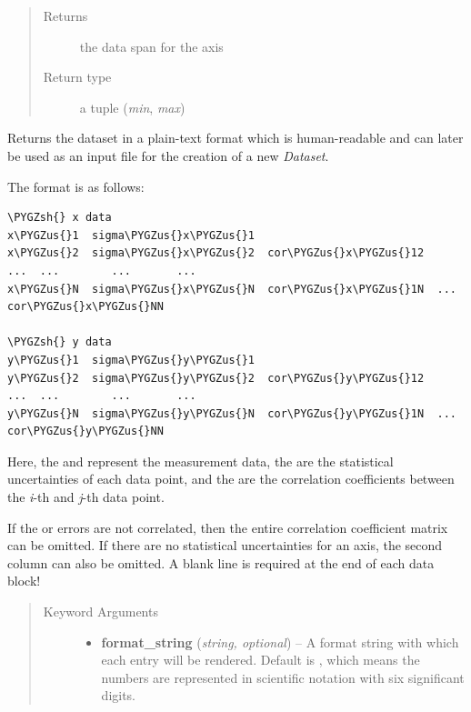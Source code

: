 \documentclass[a4paper,10pt,english]{sphinxmanual}
\def\PYGZus{\char`\_}
\def\PYGZsh{\char`\#}
\begin{document}
\begin{fulllineitems}
\begin{fulllineitems}
\begin{quote}
\begin{description}
\item[{Returns}] \leavevmode
the data span for the axis

\item[{Return type}] \leavevmode
a tuple (\emph{min}, \emph{max})

\end{description}\end{quote}

\end{fulllineitems}


\begin{fulllineitems}
\label{index:kafe.dataset.Dataset.get_formatted}
Returns the dataset in a plain-text format which is human-readable and
can later be used as an input file for the creation of a new \emph{Dataset}.

The format is as follows:

\begin{Verbatim}[commandchars=\\\{\}]
\PYGZsh{} x data
x\PYGZus{}1  sigma\PYGZus{}x\PYGZus{}1
x\PYGZus{}2  sigma\PYGZus{}x\PYGZus{}2  cor\PYGZus{}x\PYGZus{}12
...  ...        ...       ...
x\PYGZus{}N  sigma\PYGZus{}x\PYGZus{}N  cor\PYGZus{}x\PYGZus{}1N  ...  cor\PYGZus{}x\PYGZus{}NN

\PYGZsh{} y data
y\PYGZus{}1  sigma\PYGZus{}y\PYGZus{}1
y\PYGZus{}2  sigma\PYGZus{}y\PYGZus{}2  cor\PYGZus{}y\PYGZus{}12
...  ...        ...       ...
y\PYGZus{}N  sigma\PYGZus{}y\PYGZus{}N  cor\PYGZus{}y\PYGZus{}1N  ...  cor\PYGZus{}y\PYGZus{}NN
\end{Verbatim}

Here, the  and  represent the measurement data, the
 are the statistical uncertainties of each data point, and
the  are the correlation coefficients between the \emph{i}-th
and \emph{j}-th data point.

If the  or  errors are not correlated, then the entire
correlation coefficient matrix can be omitted. If there are no
statistical uncertainties for an axis, the second column can also be
omitted. A blank line is required at the end of each data block!
\begin{quote}\begin{description}
\item[{Keyword Arguments}] \leavevmode\begin{itemize}
\item {} 
\textbf{format\_string} (\emph{string, optional}) --
A format string with which each entry will be rendered. Default is
, which means the numbers are represented in scientific
notation with six significant digits.


\end{itemize}
\end{description}
\end{quote}
\end{fulllineitems}
\end{fulllineitems}
\end{document}
